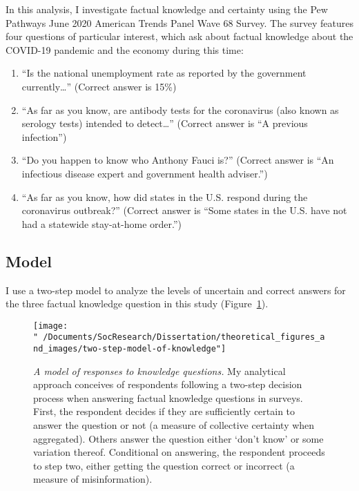 \documentclass[11pt]{article}
\begin{document}
In this analysis, I investigate factual knowledge and certainty using the Pew Pathways June 2020 American Trends Panel Wave 68 Survey. The survey features four questions of particular interest, which ask about factual knowledge about the COVID-19 pandemic and the economy during this time:

\begin{enumerate}
\def\labelenumi{(\arabic{enumi})}
  \item ``Is the national unemployment rate as reported by the government currently…'' (Correct answer is 15\%)
  \item ``As far as you know, are antibody tests for the coronavirus (also known as serology tests) intended to detect…'' (Correct answer is ``A previous infection'')
  \item ``Do you happen to know who Anthony Fauci is?'' (Correct answer is ``An infectious disease expert and government health adviser.'')
  \item ``As far as you know, how did states in the U.S. respond during the coronavirus outbreak?'' (Correct answer is ``Some states in the U.S. have not had a statewide stay-at-home order.'')
 \end{enumerate}
%

\hypertarget{model}{%
\subsection{Model}\label{sec:model}}

I use a two-step model to analyze the
levels of uncertain and correct answers for the three factual knowledge
question in this study (Figure~\ref{fig:TwoStepModelOfKnowledge}).

\begin{figure}[ht]
  \begin{center}
    \texttt{[image: "~/Documents/SocResearch/Dissertation/theoretical\_figures\_and\_images/two-step-model-of-knowledge"]}
  \end{center}
  \caption[A model of responses to knowledge questions]
  {\emph{A model of responses to knowledge questions.}
   My analytical approach conceives of respondents following a two-step decision
   process when answering factual knowledge questions in surveys. First, the
   respondent decides if they are sufficiently certain to answer the question or
   not (a measure of collective certainty when aggregated). Others answer the
   question either `don't know' or some variation thereof. Conditional on
   answering, the respondent proceeds to step two, either getting the question
   correct or incorrect (a measure of misinformation).}
  \label{fig:TwoStepModelOfKnowledge}
\end{figure}
\end{document}

